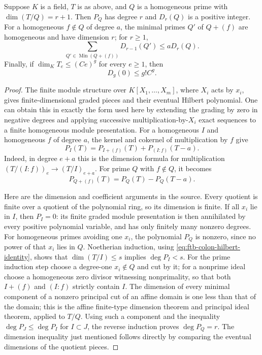 \begin{lemma}
\label{lem:ftb-graded-degree-calculation}
Suppose \(K\) is a field, \(T\) is as above, and
\(Q\) is a homogeneous prime with \(\dim(T/Q)=r+1\).
Then \(P_Q\) has degree \(r\) and \(D_r(Q)\) is a positive
integer.
For a homogeneous \(f\notin Q\) of degree \(a\), the
minimal primes \(Q'\) of \(Q+(f)\) are homogeneous and have
dimension \(r\); for \(r\ge1\),
\[
             \sum_{Q'\in\operatorname{Min}(Q+(f))}
                        D_{r-1}(Q')\le aD_r(Q).
 \tag{TZ2}\label{eq:ftb-graded-cut-degree}
\]
Finally, if \(\dim_KT_e\le(Ce)^g\) for every \(e\ge1\), then
\[
                             D_g(0)\le g!C^g.
 \tag{TZ3}\label{eq:ftb-graded-growth-degree}
\]
\end{lemma}
\begin{proof}
The finite module structure over \(K[X_1,\ldots,X_m]\),
where \(X_i\) acts by \(x_i\), gives finite-dimensional
graded pieces and their eventual Hilbert polynomial.
One can obtain this in exactly the form used here by extending
the grading by zero in negative degrees and applying
successive multiplication-by-\(X_i\) exact sequences to
a finite homogeneous module presentation.
For a homogeneous \(I\) and homogeneous \(f\) of degree \(a\),
the kernel and cokernel of multiplication by \(f\) give
\[
 P_I(T)=P_{I+(f)}(T)+P_{(I:f)}(T-a).
 \tag{TZ4}\label{eq:ftb-colon-hilbert-identity}
\]
Indeed, in degree \(e+a\) this is the dimension formula
for multiplication \( (T/(I:f))_e\to(T/I)_{e+a}\).
For prime \(Q\) with \(f\notin Q\), it becomes
\[
                   P_{Q+(f)}(T)=P_Q(T)-P_Q(T-a).
 \tag{TZ5}\label{eq:ftb-prime-hilbert-difference}
\]

Here are the dimension and coefficient arguments in the source.
Every quotient is finite over a quotient of the polynomial ring,
so its dimension is finite.
If all \(x_i\) lie in \(I\), then \(P_I=0\): its finite
graded module presentation is then annihilated by every positive
polynomial variable, and has only finitely many nonzero degrees.
For homogeneous primes avoiding one \(x_i\), the polynomial
\(P_Q\) is nonzero, since no power of that \(x_i\) lies in \(Q\).
Noetherian induction, using \eqref{eq:ftb-colon-hilbert-identity},
shows that \(\dim(T/I)\le s\) implies \(\deg P_I<s\).
For the prime induction step choose a degree-one \(x_i\notin Q\)
and cut by it; for a nonprime ideal choose a homogeneous
zero divisor witnessing nonprimality, so that both \(I+(f)\)
and \((I:f)\) strictly contain \(I\).
The dimension of every minimal component of a nonzero principal
cut of an affine domain is one less than that of the domain;
this is the affine finite-type dimension theorem and principal
ideal theorem, applied to \(T/Q\).
Using such a component and the inequality
\(\deg P_J\le\deg P_I\) for \(I\subset J\), the reverse
induction proves \(\deg P_Q=r\).
The dimension inequality just mentioned follows directly by
comparing the eventual dimensions of the quotient pieces.


\end{proof}
